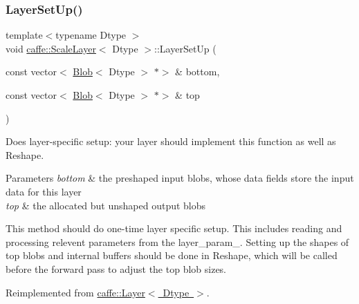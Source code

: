 \mbox{\label{classcaffe_1_1_scale_layer_a9781f923f1ff0aad8549e0e93eebb941}} 
\subsubsection{\texorpdfstring{Layer\+Set\+Up()}{LayerSetUp()}\hspace{0.1cm}{\footnotesize\ttfamily [2/2]}}
{\footnotesize\ttfamily template$<$typename Dtype $>$ \\
void \mbox{\hyperlink{classcaffe_1_1_scale_layer}{caffe\+::\+Scale\+Layer}}$<$ Dtype $>$\+::Layer\+Set\+Up (\begin{DoxyParamCaption}\item[{const vector$<$ \mbox{\hyperlink{classcaffe_1_1_blob}{Blob}}$<$ Dtype $>$ $\ast$$>$ \&}]{bottom,  }\item[{const vector$<$ \mbox{\hyperlink{classcaffe_1_1_blob}{Blob}}$<$ Dtype $>$ $\ast$$>$ \&}]{top }\end{DoxyParamCaption})\hspace{0.3cm}{\ttfamily [virtual]}}



Does layer-\/specific setup\+: your layer should implement this function as well as Reshape. 


\begin{DoxyParams}{Parameters}
{\em bottom} & the preshaped input blobs, whose data fields store the input data for this layer \\
\hline
{\em top} & the allocated but unshaped output blobs\\
\hline
\end{DoxyParams}
This method should do one-\/time layer specific setup. This includes reading and processing relevent parameters from the {\ttfamily layer\+\_\+param\+\_\+}. Setting up the shapes of top blobs and internal buffers should be done in {\ttfamily Reshape}, which will be called before the forward pass to adjust the top blob sizes. 

Reimplemented from \mbox{\hyperlink{classcaffe_1_1_layer_a481323a3e0972c682787f2137468c29f}{caffe\+::\+Layer$<$ Dtype $>$}}.

\mbox{\label{classcaffe_1_1_scale_layer_a7867d035776f78fe486ce633ec0520ad}} 

